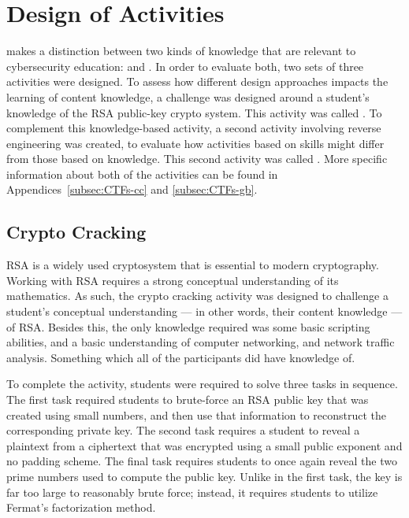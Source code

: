 


\providecommand{\heading}[1]{\section{#1}}
\providecommand{\subheading}[1]{\subsection{#1}}

\heading{Design of Activities}
    \textcite{R-Weiss} makes a distinction between two kinds of knowledge that are relevant to cybersecurity education:  and . %
In order to evaluate both, two sets of three activities were designed. %
To assess how different design approaches impacts the learning of content knowledge, a challenge was designed around a student's  knowledge of the RSA public-key crypto system. %
This activity was called . %
To complement this knowledge-based activity, a second activity involving reverse engineering was created, to evaluate how activities based on skills might differ from those based on knowledge. %
This second activity was called . %
More specific information about both of the activities can be found in Appendices~\ref{subsec:CTFs-cc} and \ref{subsec:CTFs-gb}.

\subheading{Crypto Cracking}
    RSA is a widely used cryptosystem that is essential to modern cryptography. %
Working with RSA requires a strong conceptual understanding of its mathematics. %
As such, the crypto cracking activity was designed to challenge a student's conceptual understanding ---%
 in other words, their content knowledge ---%
 of RSA. Besides this, the only knowledge required was some basic scripting abilities, and a basic understanding of computer networking, and network traffic analysis. %
Something which all of the participants did have knowledge of. 

    To complete the activity, students were required to solve three tasks in sequence. %
The first task required students to brute-force an RSA public key that was created using small numbers, and then use that information to reconstruct the corresponding private key. %
The second task requires a student to reveal a plaintext from a ciphertext that was encrypted using a small public exponent and no padding scheme. %
The final task requires students to once again reveal the two prime numbers used to compute the public key. %
Unlike in the first task, the key is far too large to reasonably brute force; %
instead, it requires students to utilize Fermat's factorization method. 

